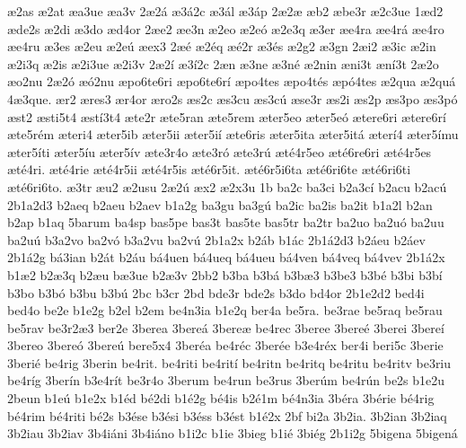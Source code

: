 {^^e62as
^^e62at
^^e6a3ue
^^e6a3v
2^^e62^^e1
^^e63^^e12c
^^e63^^e1l
^^e63^^e1p
2^^e62^^e6
^^e6b2
^^e6be3r
^^e62c3ue
1^^e6d2
^^e6de2s
^^e62di
^^e63do
^^e6d4or
2^^e6e2
^^e6e3n
^^e62eo
^^e62e^^f3
^^e62e3q
^^e63er
^^e6e4ra
^^e6e4r^^e1
^^e6e4ro
^^e6e4ru
^^e63es
^^e62eu
^^e62e^^fa
^^e6ex3
2^^e6^^e9
^^e62^^e9q
^^e6^^e92r
^^e63^^e9s
^^e62g2
^^e63gn
2^^e6i2
^^e63ic
^^e62in
^^e62i3q
^^e62is
^^e62i3ue
^^e62i3v
2^^e62^^ed
^^e63^^ed2c
2^^e6n
^^e63ne
^^e63n^^e9
^^e62nin
^^e6ni3t
^^e6n^^ed3t
2^^e62o
^^e6o2nu
2^^e62^^f3
^^e6^^f32nu
^^e6po6te6ri
^^e6po6te6r^^ed
^^e6po4tes
^^e6po4t^^e9s
^^e6p^^f34tes
^^e62qua
^^e62qu^^e1
4^^e63que.
^^e6r2
^^e6res3
^^e6r4or
^^e6ro2s
^^e6s2c
^^e6s3cu
^^e6s3c^^fa
^^e6se3r
^^e6s2i
^^e6s2p
^^e6s3po
^^e6s3p^^f3
^^e6st2
^^e6sti5t4
^^e6st^^ed3t4
^^e6te2r
^^e6te5ran
^^e6te5rem
^^e6ter5eo
^^e6ter5e^^f3
^^e6tere6ri
^^e6tere6r^^ed
^^e6te5r^^e9m
^^e6teri4
^^e6ter5ib
^^e6ter5ii
^^e6ter5i^^ed
^^e6te6ris
^^e6ter5ita
^^e6ter5it^^e1
^^e6ter^^ed4
^^e6ter5^^edmu
^^e6ter5^^edti
^^e6ter5^^edu
^^e6ter5^^edv
^^e6te3r4o
^^e6te3r^^f3
^^e6te3r^^fa
^^e6t^^e94r5eo
^^e6t^^e96re6ri
^^e6t^^e94r5es
^^e6t^^e94ri.
^^e6t^^e94rie
^^e6t^^e94r5ii
^^e6t^^e94r5is
^^e6t^^e96r5it.
^^e6t^^e96r5i6ta
^^e6t^^e96ri6te
^^e6t^^e96ri6ti
^^e6t^^e96ri6to.
^^e63tr
^^e6u2
^^e62usu
2^^e62^^fa
^^e6x2
^^e62x3u
1b
ba2c
ba3ci
b2a3c^^ed
b2acu
b2ac^^fa
2b1a2d3
b2aeq
b2aeu
b2aev
b1a2g
ba3gu
ba3g^^fa
ba2ic
ba2is
ba2it
b1a2l
b2an
b2ap
b1aq
5barum
ba4sp
bas5pe
bas3t
bas5te
bas5tr
ba2tr
ba2uo
ba2u^^f3
ba2uu
ba2u^^fa
b3a2vo
ba2v^^f3
b3a2vu
ba2v^^fa
2b1a2x
b2^^e1b
b1^^e1c
2b1^^e12d3
b2^^e1eu
b2^^e1ev
2b1^^e12g
b^^e13ian
b2^^e1t
b2^^e1u
b^^e14uen
b^^e14ueq
b^^e14ueu
b^^e14ven
b^^e14veq
b^^e14vev
2b1^^e12x
b1^^e62
b2^^e63q
b2^^e6u
b^^e63ue
b2^^e63v
2bb2
b3ba
b3b^^e1
b3b^^e63
b3be3
b3b^^e9
b3bi
b3b^^ed
b3bo
b3b^^f3
b3bu
b3b^^fa
2bc
b3cr
2bd
bde3r
bde2s
b3do
bd4or
2b1e2d2
bed4i
bed4o
be2e
b1e2g
b2el
b2em
be4n3ia
b1e2q
ber4a
be5ra.
be3rae
be5raq
be5rau
be5rav
be3r2^^e63
ber2e
3berea
3bere^^e1
3bere^^e6
be4rec
3beree
3bere^^e9
3berei
3bere^^ed
3bereo
3bere^^f3
3bere^^fa
bere5x4
3ber^^e9a
be4r^^e9c
3ber^^e9e
b3e4r^^e9x
ber4i
beri5c
3berie
3beri^^e9
be4rig
3berin
be4rit.
be4riti
be4rit^^ed
be4ritn
be4ritq
be4ritu
be4ritv
be3riu
be4r^^edg
3ber^^edn
b3e4r^^edt
be3r4o
3berum
be4run
be3rus
3ber^^fam
be4r^^fan
be2s
b1e2u
2beun
b1e^^fa
b1e2x
b1^^e9d
b^^e92di
b1^^e92g
b^^e94is
b2^^e91m
b^^e94n3ia
3b^^e9ra
3b^^e9rie
b^^e94rig
b^^e94rim
b^^e94riti
b^^e92s
b3^^e9se
b3^^e9si
b3^^e9ss
b3^^e9st
b1^^e92x
2bf
bi2a
3b2ia.
3b2ian
3b2iaq
3b2iau
3b2iav
3b4i^^e1ni
3b4i^^e1no
b1i2c
b1ie
3bieg
b1i^^e9
3bi^^e9g
2b1i2g
5bigena
5bigen^^e1
}
